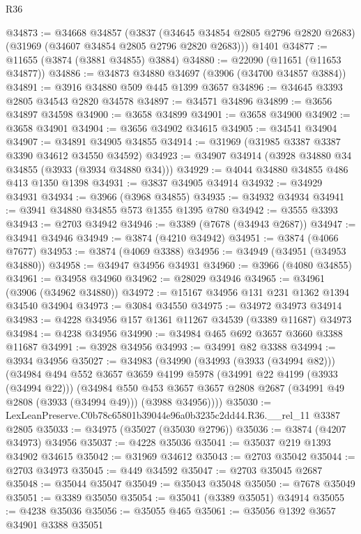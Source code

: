 \begin{lexlean}{R36}
\begin{coremodule}
@34873 := @34668
    @34857
    (@3837 (@34645 @34854 @2805 @2796 @2820 @2683) (@31969 (@34607 @34854 @2805 @2796 @2820 @2683)))
    @1401
@34877 := @11655 (@3874 (@3881 @34855) @3884)
@34880 := @22090 (@11651 (@11653 @34877))
@34886 := @34873 @34880 @34697 (@3906 (@34700 @34857 @3884))
@34891 := @3916 @34880 @509 @445 @1399 @3657
@34896 := @34645 @3393 @2805 @34543 @2820 @34578
@34897 := @34571 @34896
@34899 := @3656 @34897 @34598
@34900 := @3658 @34899
@34901 := @3658 @34900
@34902 := @3658 @34901
@34904 := @3656 @34902 @34615
@34905 := @34541 @34904
@34907 := @34891 @34905 @34855
@34914 := @31969 (@31985 @3387 @3387 @3390 @34612 @34550 @34592)
@34923 := @34907 @34914 (@3928 @34880 @34 @34855 (@3933 (@3934 @34880 @34)))
@34929 := @4044 @34880 @34855 @486 @413 @1350 @1398
@34931 := @3837 @34905 @34914
@34932 := @34929 @34931
@34934 := @3966 (@3968 @34855)
@34935 := @34932 @34934
@34941 := @3941 @34880 @34855 @573 @1355 @1395 @780
@34942 := @3555 @3393
@34943 := @2703 @34942
@34946 := @3389 (@7678 (@34943 @2687))
@34947 := @34941 @34946
@34949 := @3874 (@4210 @34942)
@34951 := @3874 (@4066 @7677)
@34953 := @3874 (@4069 @3388)
@34956 := @34949 (@34951 (@34953 @34880))
@34958 := @34947 @34956 @34931
@34960 := @3966 (@4080 @34855)
@34961 := @34958 @34960
@34962 := @28029 @34946
@34965 := @34961 (@3906 (@34962 @34880))
@34972 := @15167 @34956 @131 @231 @1362 @1394 @34540 @34904
@34973 := @3084 @34550
@34975 := @34972 @34973 @34914
@34983 := @4228 @34956 @157 @1361 @11267 @34539 (@3389 @11687) @34973
@34984 := @4238 @34956
@34990 := @34984 @465 @692 @3657 @3660 @3388 @11687
@34991 := @3928 @34956
@34993 := @34991 @82 @3388
@34994 := @3934 @34956
@35027 := @34983
    (@34990
      (@34993 (@3933 (@34994 @82)))
      (@34984
        @494
        @552
        @3657
        @3659
        @4199
        @5978
        (@34991 @22 @4199 (@3933 (@34994 @22)))
        (@34984
          @550
          @453
          @3657
          @3657
          @2808
          @2687
          (@34991 @49 @2808 (@3933 (@34994 @49)))
          (@3988 @34956))))
@35030 := LexLeanPreserve.C0b78c65801b39044e96a0b3235c2dd44.R36.__rel_11 @3387 @2805
@35033 := @34975 (@35027 (@35030 @2796))
@35036 := @3874 (@4207 @34973) @34956
@35037 := @4228 @35036
@35041 := @35037 @219 @1393 @34902 @34615
@35042 := @31969 @34612
@35043 := @2703 @35042
@35044 := @2703 @34973
@35045 := @449 @34592
@35047 := @2703 @35045 @2687
@35048 := @35044 @35047
@35049 := @35043 @35048
@35050 := @7678 @35049
@35051 := @3389 @35050
@35054 := @35041 (@3389 @35051) @34914
@35055 := @4238 @35036
@35056 := @35055 @465
@35061 := @35056 @1392 @3657 @34901 @3388 @35051

\end{coremodule}
\end{lexlean}
